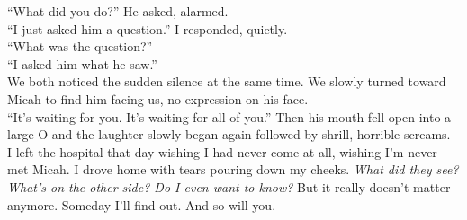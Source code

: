 \documentclass[a5paper]{scrartcl}
\begin{document}
\enquote{What did you do?} He asked, alarmed.\\
\enquote{I just asked him a question.} I responded, quietly.\\
\enquote{What was the question?}\\
\enquote{I asked him what he saw.}\\
We both noticed the sudden silence at the same time. We slowly turned toward Micah to find him facing us, no expression on his face.\\
\enquote{It's waiting for you. It's waiting for all of you.} Then his mouth fell open into a large O and the laughter slowly began again followed by shrill, horrible screams.\\
I left the hospital that day wishing I had never come at all, wishing I'm never met Micah. I drove home with tears pouring down my cheeks. \textit{What did they see? What's on the other side? Do I even want to know?} But it really doesn't matter anymore. Someday I'll find out. And so will you.
\end{document}
